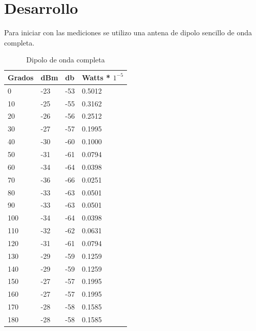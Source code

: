 \documentclass[12pt,letterpaper]{article}
\begin{document}
\newpage
\section{Desarrollo}
Para iniciar con las mediciones se utilizo una antena de dipolo sencillo de onda completa.
\begin{table}[h]
    \centering
    \begin{tabular}{|l|l|l|l|}
    \hline
    Grados & dBm & db & Watts * $1^{-5}$ \\ \hline
    0 & -23 & -53 & 0.5012 \\ \hline
    10 & -25 & -55 & 0.3162 \\ \hline
    20 & -26 & -56 & 0.2512 \\ \hline
    30 & -27 & -57 & 0.1995 \\ \hline
    40 & -30 & -60 & 0.1000 \\ \hline
    50 & -31 & -61 & 0.0794 \\ \hline
    60 & -34 & -64 & 0.0398 \\ \hline
    70 & -36 & -66 & 0.0251 \\ \hline
    80 & -33 & -63 & 0.0501 \\ \hline
    90 & -33 & -63 & 0.0501 \\ \hline
    100 & -34 & -64 & 0.0398 \\ \hline
    110 & -32 & -62 & 0.0631 \\ \hline
    120 & -31 & -61 & 0.0794 \\ \hline
    130 & -29 & -59 & 0.1259 \\ \hline
    140 & -29 & -59 & 0.1259 \\ \hline
    150 & -27 & -57 & 0.1995 \\ \hline
    160 & -27 & -57 & 0.1995 \\ \hline
    170 & -28 & -58 & 0.1585 \\ \hline
    180 & -28 & -58 & 0.1585 \\ \hline
    \end{tabular}
    \caption{Dipolo de onda completa}
    \label{my-label}
\end{table}

\newpage
\end{document}
